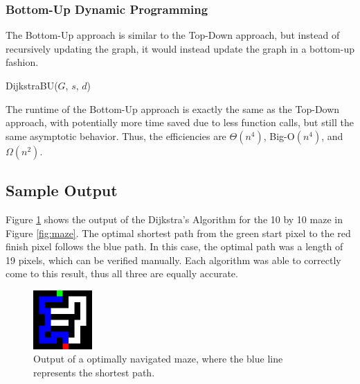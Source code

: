 \documentclass[11pt]{article}
\begin{document}
\begin{multicols}{2}
	\subsubsection{Bottom-Up Dynamic Programming}
	The Bottom-Up approach is similar to the Top-Down approach, but instead of recursively updating
	the graph, it would instead update the graph in a bottom-up fashion.

	\begin{algorithm}[H]
		\SetAlgoLined
		\SetStartEndCondition{ }{}{}%
		\AlgoDontDisplayBlockMarkers\SetAlgoNoEnd\SetAlgoNoLine%
		\caption{DijkstraBU(${G}$, ${s}$, ${d}$)\label{bd}}
	\end{algorithm}

	The runtime of the Bottom-Up approach is exactly the same as the Top-Down approach, with
	potentially more time saved due to less function calls, but still the same asymptotic behavior. Thus, the efficiencies are
	$\Theta(n^4)$, Big-O${(n^4)}$, and
	${\Omega(n^2)}$.

	\subsection{Sample Output}
	Figure \ref{fig:output_maze} shows the output of the Dijkstra's Algorithm for the 10 by 10 maze
	in Figure \ref{fig:maze}. The optimal shortest path from the green start pixel to the red finish
	pixel follows the blue path. In this case, the optimal path was a length of 19 pixels, which can
	be verified manually. Each algorithm was able to correctly come to this result, thus all three
	are equally accurate.

	\begin{figure}[H]
		\centering
		\includegraphics[width=0.2\textwidth]{figures/output_maze_10x10.png}
		\caption{Output of a optimally navigated maze, where the blue line represents the shortest
			path. \label{fig:output_maze}}
	\end{figure}


\end{multicols}
\end{document}
